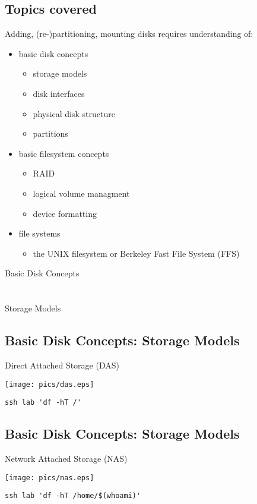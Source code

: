 \documentclass[xga]{xdvislides}
\begin{document}
\subsection{Topics covered}
Adding, (re-)partitioning, mounting disks requires understanding of:
\begin{itemize}
	\item basic disk concepts
		\begin{itemize}
			\item storage models
			\item disk interfaces
			\item physical disk structure
			\item partitions
		\end{itemize}
	\item basic filesystem concepts
		\begin{itemize}
			\item RAID
			\item logical volume managment
			\item device formatting
		\end{itemize}
	\item file systems
		\begin{itemize}
			\item the UNIX filesystem or Berkeley Fast File System (FFS)
		\end{itemize}
\end{itemize}

\newpage
\vspace*{\fill}
\begin{center}
	\Hugesize
		Basic Disk Concepts \\ [1em]
	\hspace*{5mm}
	\blueline\\
	\hspace*{5mm}\\
		Storage Models
\end{center}
\vspace*{\fill}

\subsection{Basic Disk Concepts: Storage Models}
Direct Attached Storage (DAS)
\vfill
\begin{center}
	\texttt{[image: pics/das.eps]} \\
\end{center}
\verb+ssh lab 'df -hT /'+
\vfill

\subsection{Basic Disk Concepts: Storage Models}
Network Attached Storage (NAS)
\vfill
\begin{center}
	\texttt{[image: pics/nas.eps]} \\
\end{center}
\verb+ssh lab 'df -hT /home/$(whoami)'+
\vfill
\end{document}
